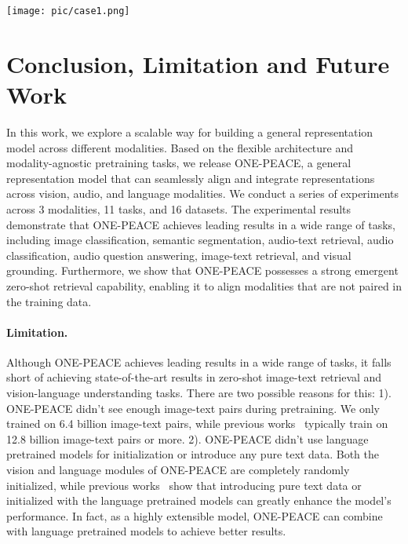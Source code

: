 \documentclass{article}
\newcommand{\onepeace}{ONE-PEACE\xspace}
\begin{document}
\begin{figure*}[t]
\vskip 0.2in
    \centering
    \texttt{[image: pic/case1.png]}
    \caption{Examples of emergent zero-shot retrieval. \onepeace~is capable of aligning modalities and modality combinations, where there are no paired data of the modalities in the pretraining dataset. The images are retrieved from ImageNet-1K and MSCOCO.}
    \label{fig:case1}
\end{figure*}

 \section{Conclusion, Limitation and Future Work}
In this work, we explore a scalable way for building a general representation model across different modalities.
Based on the flexible architecture and modality-agnostic pretraining tasks, we release \onepeace, a general representation model that can seamlessly align and integrate representations across vision, audio, and language modalities.
We conduct a series of experiments across 3 modalities, 11 tasks, and 16 datasets.
The experimental results demonstrate that \onepeace achieves leading results in a wide range of tasks, including image classification, semantic segmentation, audio-text retrieval, audio classification, audio question answering, image-text retrieval, and visual grounding.
Furthermore, we show that \onepeace possesses a strong emergent zero-shot retrieval capability, enabling it to align modalities that are not paired in the training data.



\paragraph{Limitation.}
Although \onepeace achieves leading results in a wide range of tasks, it falls short of achieving state-of-the-art results in zero-shot image-text retrieval and vision-language understanding tasks.
There are two possible reasons for this:
1). \onepeace didn't see enough image-text pairs during pretraining. We only trained on 6.4 billion image-text pairs, while previous works~\cite{clip,align,coca} typically train on 12.8 billion image-text pairs or more.
2). \onepeace didn't use language pretrained models for initialization or introduce any pure text data. Both the vision and language modules of \onepeace are completely randomly initialized, while previous works~\cite{ofa,blip2} show that introducing pure text data or initialized with the language pretrained models can greatly enhance the model's performance. 
In fact, as a highly extensible model, \onepeace can combine with language pretrained models to achieve better results.
\end{document}
